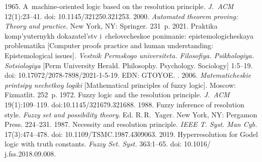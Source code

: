 

 


  \begin{multicols}{2}

\renewcommand{\bibname}{\protect\rmfamily References}

{\small\frenchspacing
 {%
 \begin{thebibliography}{99} 
 1965. A~machine-oriented logic based on the resolution 
principle.  \textit{J.~ACM} 12(1):23--41. doi: 10.1145/321250.321253.
 2000. \textit{Automated theorem proving: Theory and practice}. 
New York, NY: Springer. 231~p.
 2021. Praktika komp'yuternykh dokazatel'stv 
i~chelovecheskoe ponimanie: epi\-ste\-mo\-lo\-gi\-che\-skaya problematika [Computer 
proofs practice and human understanding: Epistemological issues]. \textit{Vestnik 
Permskogo universiteta. Filosofiya. Psikhologiya. So\-tsi\-o\-lo\-giya} [Perm University 
Herald. Philosophy. Psychology. Sociology] 1:5--19.  
doi: 10.17072/2078-7898/2021-1-5-19. EDN: GTOYOE.
. 2006. \textit{Ma\-te\-ma\-ti\-che\-skie 
prin\-tsi\-py ne\-chet\-koy logiki} [Mathematical principles of fuzzy logic]. Moscow: 
Fizmatlit. 252~p.
 1972. Fuzzy logic and the resolution principle. \textit{J.~ACM} 
19(1):109--119. doi:10.1145/321679.321688.
 1988. Fuzzy inference of resolution style. \textit{Fuzzy set and 
possibility theory}. Ed. R.\,R.~Yager.  New York, NY: Pergamon Press. 224--231.
 1987. Necessity and resolution principle. 
\textit{IEEE T. Syst. Man Cyb.} 17(3):474--478. doi: 
10.1109/TSMC.1987.4309063.
 2019. Hyperresolution for G$\ddot{\mbox{o}}$del logic with truth 
constants. \textit{Fuzzy Set. Syst.} 363:1--65. doi: 10.1016/ j.fss.2018.09.008.



\end{thebibliography}}}
\end{multicols}
